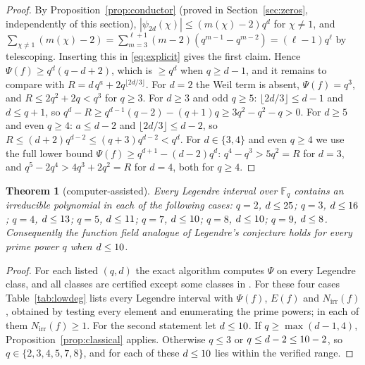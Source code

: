 \documentclass[11pt,a4paper]{article}
\newtheorem{theorem}{Theorem}[section]
\theoremstyle{definition}
\theoremstyle{remark}
\newcommand{\Fq}{\mathbb{F}_q}
\newcommand{\Nirr}{N_{\mathrm{irr}}}
\begin{document}
\begin{proof}
By Proposition~\ref{prop:conductor} (proved in Section~\ref{sec:zeros}, independently of this
section), $|\psi_{2d}(\chi)|\le(m(\chi)-2)q^d$ for $\chi\ne1$, and
$\sum_{\chi\ne1}(m(\chi)-2)=\sum_{m=3}^{\ell+1}(m-2)(q^{m-1}-q^{m-2})=(\ell-1)q^\ell$ by telescoping.
Inserting this in \eqref{eq:explicit} gives the first claim. Hence $\Psi(f)\ge q^d(q-d+2)$, which is
$\ge q^d$ when $q\ge d-1$, and it remains to compare with $R=d\,q^a+2q^{\lfloor2d/3\rfloor}$.
For $d=2$ the Weil term is absent, $\Psi(f)=q^3$, and $R\le2q^2+2q<q^3$ for $q\ge3$.
For $d\ge3$ and odd $q\ge5$: $\lfloor2d/3\rfloor\le d-1$ and $d\le q+1$, so
$q^d-R\ge q^{d-1}(q-2)-(q+1)q\ge3q^2-q^2-q>0$.
For $d\ge5$ and even $q\ge4$: $a\le d-2$ and $\lfloor2d/3\rfloor\le d-2$, so
$R\le(d+2)q^{d-2}\le(q+3)q^{d-2}<q^d$.
For $d\in\{3,4\}$ and even $q\ge4$ we use the full lower bound $\Psi(f)\ge q^{d+1}-(d-2)q^d$:
$q^4-q^3>5q^2=R$ for $d=3$, and $q^5-2q^4>4q^3+2q^2=R$ for $d=4$, both for $q\ge4$.
\end{proof}

\begin{theorem}[computer-assisted]\label{thm:verify}
Every Legendre interval over $\Fq$ contains an irreducible polynomial in each of the following cases:
$q=2$, $d\le25$; $q=3$, $d\le16$; $q=4$, $d\le13$; $q=5$, $d\le11$;
$q=7$, $d\le10$; $q=8$, $d\le10$; $q=9$, $d\le8$. Consequently the
function field analogue of Legendre's conjecture holds for every prime power $q$ when $d\le10$.
\end{theorem}

\begin{proof}
For each listed $(q,d)$ the exact algorithm computes $\Psi$ on every Legendre class, and all classes are
certified except some classes in \Uncertified. For these four cases Table~\ref{tab:lowdeg} lists every
Legendre interval with $\Psi(f)$, $E(f)$ and $\Nirr(f)$, obtained by testing every element and enumerating
the prime powers; in each of them $\Nirr(f)\ge1$. For the second statement let $d\le10$. If
$q\ge\max(d-1,4)$, Proposition~\ref{prop:classical} applies. Otherwise $q\le3$ or $q\le d-2\le10-2$,
so $q\in\{2,3,4,5,7,8\}$, and for each of these $d\le10$ lies within the verified range.
\end{proof}

\begin{table}[ht]
\centering\small

\caption{All Legendre intervals for the four cases in which some interval is not certified by the bound
(last column). Each row is one interval, given by a representative $f$ (with $f_0=0$). Source:
\texttt{data/low\_degree\_char2.csv}, produced by \texttt{code/low\_degree\_cases.py}.}
\label{tab:lowdeg}
\end{table}
\end{document}
